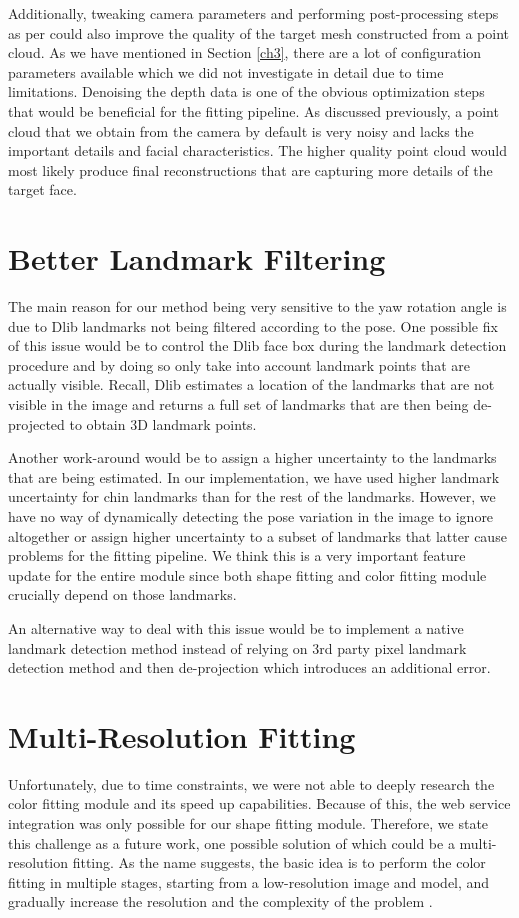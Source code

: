 Additionally, tweaking camera parameters and performing post-processing steps as per \cite{bestcal} could also improve the quality of the target mesh constructed from a point cloud. As we have mentioned in Section \ref{ch3}, there are a lot of configuration parameters available which we did not investigate in detail due to time limitations. Denoising the depth data is one of the obvious optimization steps that would be beneficial for the fitting pipeline\cite{icpram19}. As discussed previously, a point cloud that we obtain from the camera by default is very noisy and lacks the important details and facial characteristics. The higher quality point cloud would most likely produce final reconstructions that are capturing more details of the target face. 

\section{Better Landmark Filtering}
The main reason for our method being very sensitive to the yaw rotation angle is due to Dlib landmarks not being filtered according to the pose. One possible fix of this issue would be to control the Dlib face box during the landmark detection procedure and by doing so only take into account landmark points that are actually visible. Recall, Dlib estimates a location of the landmarks that are not visible in the image and returns a full set of landmarks that are then being de-projected to obtain 3D landmark points. \bigskip

Another work-around would be to assign a higher uncertainty to the landmarks that are being estimated. In our implementation, we have used higher landmark uncertainty for chin landmarks than for the rest of the landmarks. However, we have no way of dynamically detecting the pose variation in the image to ignore altogether or assign higher uncertainty to a subset of landmarks that latter cause problems for the fitting pipeline. We think this is a very important feature update for the entire module since both shape fitting and color fitting module crucially depend on those landmarks. \bigskip

An alternative way to deal with this issue would be to implement a native landmark detection method instead of relying on 3rd party pixel landmark detection method and then de-projection which introduces an additional error. 

\section{Multi-Resolution Fitting}
Unfortunately, due to time constraints, we were not able to deeply research the color fitting module and its speed up capabilities. Because of this, the web service integration was only possible for our shape fitting module. Therefore, we state this challenge as a future work, one possible solution of which could be a multi-resolution fitting. As the name suggests, the basic idea is to perform the color fitting in multiple stages, starting from a low-resolution image and model, and gradually increase the resolution and the complexity of the problem \cite{10.1007/3-540-47967-8_46, surrey809478, visapp16}. \bigskip